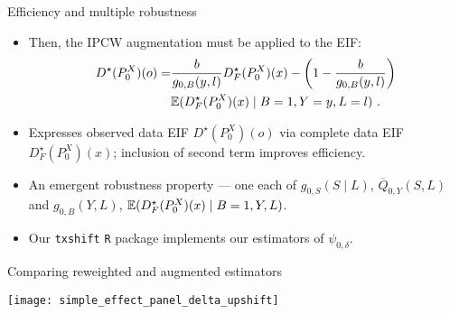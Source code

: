 \documentclass{beamer}
\begin{document}
\begin{frame}[c]{Efficiency and multiple robustness~\citep{hejazi2020efficient}}

\begin{center}
\begin{itemize}
  \itemsep8pt
  \item Then, the IPCW augmentation must be applied to the EIF\footnotemark:
    \begin{align*}
      D^{\star}(P_0^X)(o) = &\frac{b}{g_{0,B}(y, l)} D^{\star}_F(P_0^X)(x) -
        \left(1 - \frac{b}{g_{0,B}(y, l)}\right) \\
        &\mathbb{E}(D^{\star}_F(P_0^X)(x) \mid B = 1, Y = y, L = l) \,\, .
    \end{align*}
  \item Expresses observed data EIF $D^{\star}(P_0^X)(o)$ via complete data
     EIF $D^{\star}_F(P_0^X)(x)$; inclusion of second term improves efficiency.
 \item An emergent robustness property --- one each of
    $g_{0,S}(S \mid L)$, $\overline{Q}_{0,Y}(S,L)$ and $g_{0,B}(Y, L)$,
    $\mathbb{E}(D^{\star}_F(P^X_0)(x) \mid B = 1, Y, L)$.
  \item Our \texttt{txshift} \texttt{R} package implements our estimators of
    $\psi_{0,\delta}$.
\end{itemize}
\end{center}



\end{frame}



\begin{frame}[c]{Comparing reweighted and augmented estimators}

\hspace*{-0.75cm}\texttt{[image: simple\_effect\_panel\_delta\_upshift]}

\note{
}

\end{frame}
\end{document}
